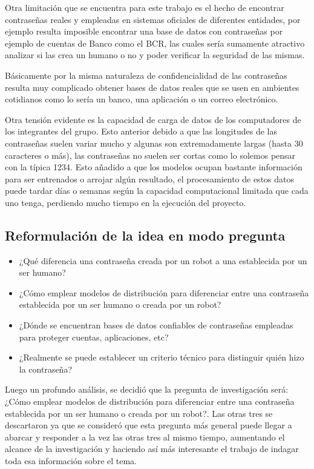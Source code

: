 \documentclass[
  10pt,
  letterpaper,
  12pt,
  oneside]{book}
\begin{document}
Otra limitación que se encuentra para este trabajo es el hecho de
encontrar contraseñas reales y empleadas en sistemas oficiales de
diferentes entidades, por ejemplo resulta imposible encontrar una base
de datos con contraseñas por ejemplo de cuentas de Banco como el BCR,
las cuales sería sumamente atractivo analizar si las crea un humano o no
y poder verificar la seguridad de las mismas.

Básicamente por la misma naturaleza de confidencialidad de las
contraseñas resulta muy complicado obtener bases de datos reales que se
usen en ambientes cotidianos como lo sería un banco, una aplicación o un
correo electrónico.

Otra tensión evidente es la capacidad de carga de datos de los
computadores de los integrantes del grupo. Esto anterior debido a que
las longitudes de las contraseñas suelen variar mucho y algunas son
extremadamente largas (hasta 30 caracteres o más), las contraseñas no
suelen ser cortas como lo solemos pensar con la típica 1234. Esto
añadido a que los modelos ocupan bastante información para ser
entrenados o arrojar algún resultado, el procesamiento de estos datos
puede tardar días o semanas según la capacidad computacional limitada
que cada uno tenga, perdiendo mucho tiempo en la ejecución del proyecto.

\subsection{Reformulación de la idea en modo pregunta}

\begin {itemize}

\item ¿Qué diferencia una contraseña creada por un robot a una establecida por un ser humano?

\item ¿Cómo emplear modelos de distribución para diferenciar entre una contraseña establecida por un ser humano o creada por un robot?

\item ¿Dónde se encuentran bases de datos confiables de contraseñas empleadas para proteger cuentas, aplicaciones, etc? 

\item ¿Realmente se puede establecer un criterio técnico para distinguir quién hizo la contraseña? 

\end {itemize}

Luego un profundo análisis, se decidió que la pregunta de investigación
será: ¿Cómo emplear modelos de distribución para diferenciar entre una
contraseña establecida por un ser humano o creada por un robot?. Las
otras tres se descartaron ya que se consideró que esta pregunta más
general puede llegar a abarcar y responder a la vez las otras tres al
mismo tiempo, aumentando el alcance de la investigación y haciendo así
más interesante el trabajo de indagar toda esa información sobre el
tema.
\end{document}
